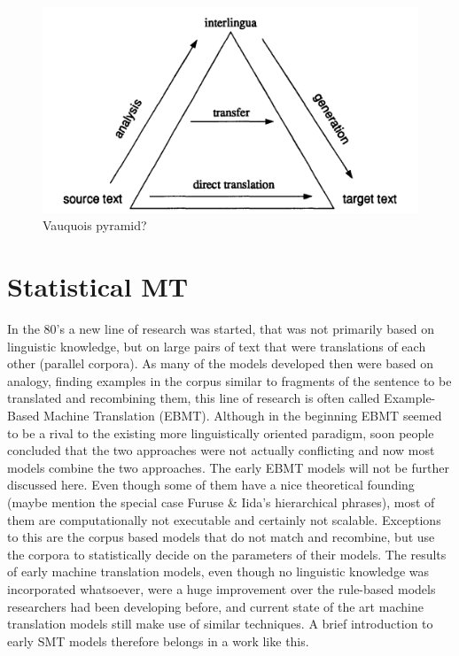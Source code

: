 \documentclass{report}
\theoremstyle{indented}
\begin{document}
\begin{figure}[!ht]
\includegraphics[scale=0.2]{translation_triangle.png}
\caption{Vauquois pyramid?}\label{fig:triangle}
\end{figure}

\section{Statistical MT}

In the 80's a new line of research was started, that was not primarily based on linguistic knowledge, but on large pairs of text that were translations of each other (parallel corpora). As many of the models developed then were based on analogy, finding examples in the corpus similar to fragments of the sentence to be translated and recombining them, this line of research is often called Example-Based Machine Translation (EBMT). Although in the beginning EBMT seemed to be a rival to the existing more linguistically oriented paradigm, soon people concluded that the two approaches were not actually conflicting and now most models combine the two approaches. The early EBMT models will not be further discussed here. Even though some of them have a nice theoretical founding (maybe mention the special case Furuse \& Iida's hierarchical phrases), most of them are computationally not executable and certainly not scalable. Exceptions to this are the corpus based models that do not match and recombine, but use the corpora to statistically decide on the parameters of their models. The results of early machine translation models, even though no linguistic knowledge was incorporated whatsoever, were a huge improvement over the rule-based models researchers had been developing before, and current state of the art machine translation models still make use of similar techniques. A brief introduction to early SMT models therefore belongs in a work like this.
\end{document}
